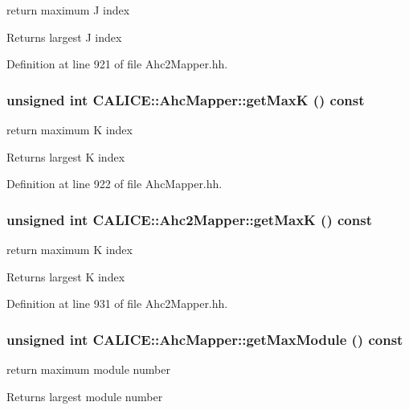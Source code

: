 return maximum J index \begin{DoxyReturn}{Returns}
largest J index 
\end{DoxyReturn}


Definition at line 921 of file Ahc2Mapper.hh.
\subsubsection[{getMaxK}]{\setlength{\rightskip}{0pt plus 5cm}unsigned int CALICE::AhcMapper::getMaxK () const\hspace{0.3cm}{\ttfamily  [inline, inherited]}}\label{group__Range_gadef3add357475764252e7a0dbe238be2}


return maximum K index \begin{DoxyReturn}{Returns}
largest K index 
\end{DoxyReturn}


Definition at line 922 of file AhcMapper.hh.
\subsubsection[{getMaxK}]{\setlength{\rightskip}{0pt plus 5cm}unsigned int CALICE::Ahc2Mapper::getMaxK () const\hspace{0.3cm}{\ttfamily  [inline, inherited]}}\label{group__Range_ga3c4dcdffcec214e9c690434596edb9ed}


return maximum K index \begin{DoxyReturn}{Returns}
largest K index 
\end{DoxyReturn}


Definition at line 931 of file Ahc2Mapper.hh.
\subsubsection[{getMaxModule}]{\setlength{\rightskip}{0pt plus 5cm}unsigned int CALICE::AhcMapper::getMaxModule () const\hspace{0.3cm}{\ttfamily  [inline, inherited]}}\label{group__Range_ga110b896619d43ab0e496dc0943c121d1}


return maximum module number \begin{DoxyReturn}{Returns}
largest module number 
\end{DoxyReturn}


